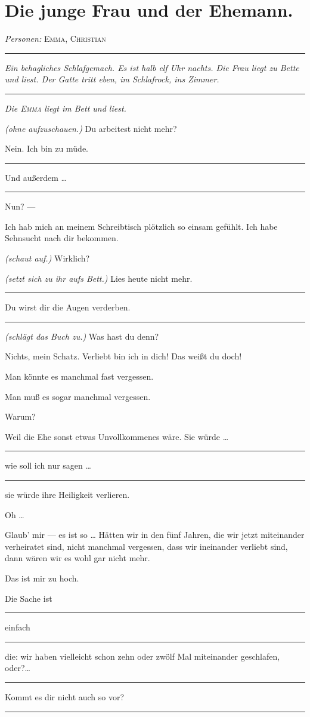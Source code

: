 \documentclass[
	final,
	a4paper,
	ngerman,
	mpinclude = true, %
	twoside = true,
	open = right,
	cleardoublepage = plain,
	DIV = 13,
	BCOR = 1cm,
	titlepage = firstiscover,
	]{scrbook}
\newcommand{\scene}{\section}
\newcommand{\direction}[1]{\textit{(#1)}}
\newcommand{\setting}[1]{\vspace{-0.5\baselineskip}\centering\textit{#1}}
\newenvironment{deletion}{%
		\vspace{0.25\baselineskip}
		\hrule
		\vspace{0.25\baselineskip}
		\color{darkgray}
	}{
		\color{black}
		\vspace{0.25\baselineskip}
		\hrule 
		\vspace{0.25\baselineskip}
	}
\newcommand{\characterlist}[1]{{\begin{center}\textit{Personen:} #1\end{center}}}
\newcommand{\thecharacter}[1]{\textup{\textsc{#1}}\xspace}
\newcommand{\thefrau}{\thecharacter{Emma}}
\newcommand{\thegatte}{\thecharacter{Christian}}
\newcommand{\character}[1]{\item[#1:]}
\newcommand{\frau}{\character{\thefrau}}
\newcommand{\gatte}{\character{\thegatte}}
\begin{document}
\scene{Die junge Frau und der Ehemann.}
\characterlist{\thefrau, \thegatte}
\begin{deletion}
\setting{Ein behagliches Schlafgemach. Es ist halb elf Uhr nachts. Die Frau liegt zu Bette und liest. Der Gatte tritt eben, im Schlafrock, ins Zimmer.}
\end{deletion}
\setting{Die \thefrau liegt im Bett und liest.}

\begin{play}

	\frau
	\direction{ohne aufzuschauen.} Du arbeitest nicht mehr?

	\gatte
	Nein. Ich bin zu müde.
	\begin{deletion}
	Und außerdem \ldots{}
	\end{deletion}

	\frau
	Nun? ---

	\gatte
	Ich hab mich an meinem Schreibtisch plötzlich so einsam gefühlt. Ich habe Sehnsucht nach dir bekommen.

	\frau
	\direction{schaut auf.} Wirklich?

	\gatte
	\direction{setzt sich zu ihr aufs Bett.} Lies heute nicht mehr.
	\begin{deletion}
	Du wirst dir die Augen verderben.
	\end{deletion}

	\frau
	\direction{schlägt das Buch zu.} Was hast du denn?

	\gatte
	Nichts, mein Schatz. Verliebt bin ich in dich! Das weißt du doch!

	\frau
	Man könnte es manchmal fast vergessen.

	\gatte
	Man muß es sogar manchmal vergessen.

	\frau
	Warum?

	\gatte
	Weil die Ehe sonst etwas Unvollkommenes wäre. Sie würde \ldots{}
	\begin{deletion}
		wie soll ich nur sagen \ldots{}
	\end{deletion}
	sie würde ihre Heiligkeit verlieren.

	\frau
	Oh \ldots{}

	\gatte
	Glaub' mir --- es ist so \ldots{} Hätten wir in den fünf Jahren, die wir jetzt miteinander verheiratet sind, nicht manchmal vergessen, dass wir ineinander verliebt sind, dann wären wir es wohl gar nicht mehr.

	\frau
	Das ist mir zu hoch.

	\gatte
	Die Sache ist
	\begin{deletion}
		einfach
	\end{deletion}
	die: wir haben vielleicht schon zehn oder zwölf Mal miteinander geschlafen, oder?\ldots{}
	\begin{deletion}
		Kommt es dir nicht auch so vor?
	\end{deletion}


\end{play}
\end{document}
